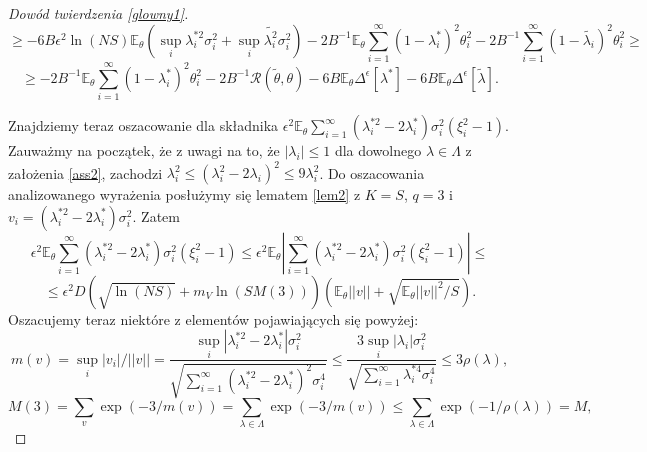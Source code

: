 \documentclass{mwart}
\begin{document}
\begin{proof}[Dowód twierdzenia \ref{glowny1}]
\begin{displaymath}
\end{displaymath}
\begin{displaymath}
\geq -6B\epsilon^2 \ln (NS)\mathbb{E}_{\theta}\left(\sup_i\lambda_i^{*2}\sigma_i^2+\sup_i\tilde{\lambda_i^2}\sigma_i^2\right)-2B^{-1}\mathbb{E}_{\theta}\sum_{i=1}^{\infty}(1-\lambda_i^*)^2\theta_i^2-2B^{-1}\sum_{i=1}^{\infty}(1-\tilde{\lambda_i})^2\theta_i^2\geq
\end{displaymath}
\begin{equation}\label{szacowanie1}
\geq -2B^{-1}\mathbb{E}_{\theta}\sum_{i=1}^{\infty}(1-\lambda_i^*)^2\theta_i^2-2B^{-1}\mathcal{R}(\tilde{\theta},\theta)-6B\mathbb{E}_{\theta}\Delta^{\epsilon}[\lambda^*]-6B\mathbb{E}_{\theta}\Delta^{\epsilon}[\tilde{\lambda}].
\end{equation}

Znajdziemy teraz oszacowanie dla składnika $\epsilon^2\mathbb{E}_{\theta}\sum_{i=1}^{\infty}(\lambda_i^{*2}-2\lambda_i^*)\sigma_i^2(\xi_i^2-1)$. Zauważmy na początek, że z uwagi na to, że $|\lambda_i|\leq 1$ dla dowolnego $\lambda\in \Lambda$ z założenia \ref{ass2}, zachodzi $\lambda_i^2\leq (\lambda_i^2-2\lambda_i)^2\leq 9\lambda_i^2$. Do oszacowania analizowanego wyrażenia posłużymy się lematem \ref{lem2} z $K=S$, $q=3$ i $v_i=(\lambda_i^{*2}-2\lambda_i^*)\sigma_i^2$. Zatem
\begin{displaymath}
\epsilon^2\mathbb{E}_{\theta}\sum_{i=1}^{\infty}(\lambda_i^{*2}-2\lambda_i^*)\sigma_i^2(\xi_i^2-1)\leq \epsilon^2\mathbb{E}_{\theta}\left|\sum_{i=1}^{\infty}(\lambda_i^{*2}-2\lambda_i^*)\sigma_i^2(\xi_i^2-1)\right|\leq
\end{displaymath}
\begin{displaymath}
\leq \epsilon^2D\left(\sqrt{\ln (NS)}+m_V\ln (SM(3))\right)\left(\mathbb{E}_{\theta}||v||+\sqrt{\mathbb{E}_{\theta}||v||^2/S}\right).
\end{displaymath}
Oszacujemy teraz niektóre z elementów pojawiających się powyżej:
\begin{displaymath}
m(v)=\sup_i|v_i|/||v||=\frac{\sup_i|\lambda_i^{*2}-2\lambda_i^*|\sigma_i^2}{\sqrt{\sum_{i=1}^{\infty}(\lambda_i^{*2}-2\lambda_i^*)^2\sigma_i^4}}\leq \frac{3\sup_i|\lambda_i|\sigma_i^2}{\sqrt{\sum_{i=1}^{\infty}\lambda_i^{*4}\sigma_i^4}}\leq 3\rho (\lambda),
\end{displaymath}
\begin{displaymath}
M(3)=\sum_{v}\exp (-3/m(v))=\sum_{\lambda\in \Lambda}\exp (-3/m(v))\leq \sum_{\lambda\in \Lambda}\exp (-1/\rho(\lambda))=M,
\end{displaymath}
\begin{displaymath}

\end{displaymath}
\end{proof}
\end{document}
